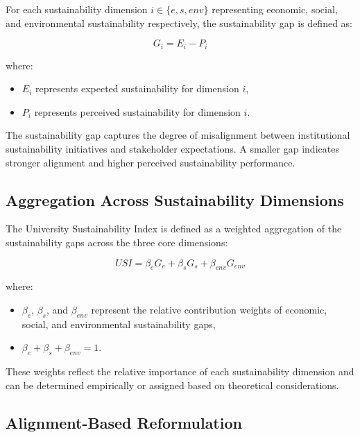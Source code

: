 \documentclass[11pt,a4paper]{article}
\begin{document}
For each sustainability dimension $i \in \{e, s, env\}$ representing economic, social, and environmental sustainability respectively, the sustainability gap is defined as:

\begin{equation}
G_i = E_i - P_i
\end{equation}

where:

\begin{itemize}
\item $E_i$ represents expected sustainability for dimension $i$,
\item $P_i$ represents perceived sustainability for dimension $i$.
\end{itemize}

The sustainability gap captures the degree of misalignment between institutional sustainability initiatives and stakeholder expectations. A smaller gap indicates stronger alignment and higher perceived sustainability performance.

\subsection{Aggregation Across Sustainability Dimensions}

The University Sustainability Index is defined as a weighted aggregation of the sustainability gaps across the three core dimensions:

\begin{equation}
USI = \beta_e G_e + \beta_s G_s + \beta_{env} G_{env}
\end{equation}

where:

\begin{itemize}
\item $\beta_e$, $\beta_s$, and $\beta_{env}$ represent the relative contribution weights of economic, social, and environmental sustainability gaps,
\item $\beta_e + \beta_s + \beta_{env} = 1$.
\end{itemize}

These weights reflect the relative importance of each sustainability dimension and can be determined empirically or assigned based on theoretical considerations.

\subsection{Alignment-Based Reformulation}
\end{document}
